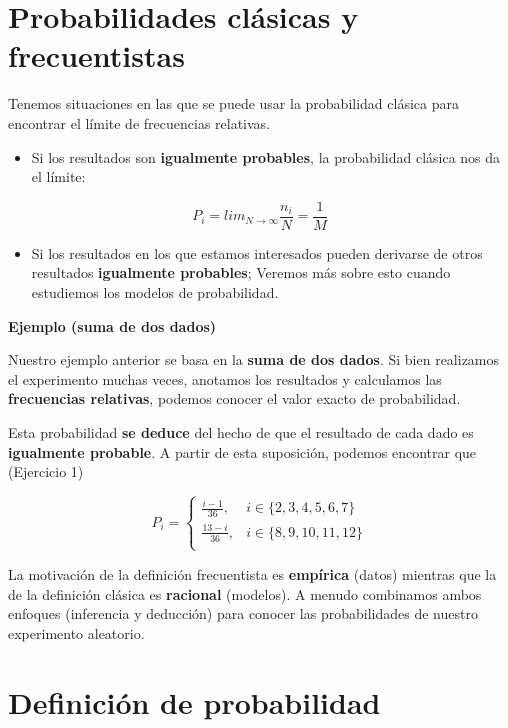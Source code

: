 \documentclass[
]{book}
\providecommand{\tightlist}{%
  \setlength{\itemsep}{0pt}\setlength{\parskip}{0pt}}
\begin{document}
\hypertarget{probabilidades-cluxe1sicas-y-frecuentistas}{%
\section{Probabilidades clásicas y frecuentistas}\label{probabilidades-cluxe1sicas-y-frecuentistas}}

Tenemos situaciones en las que se puede usar la probabilidad clásica para encontrar el límite de frecuencias relativas.

\begin{itemize}
\tightlist
\item
  Si los resultados son \textbf{igualmente probables}, la probabilidad clásica nos da el límite:
\end{itemize}

\[P_i=lim_{N\rightarrow \infty} \frac{n_i}{N}=\frac{1}{M}\]

\begin{itemize}
\tightlist
\item
  Si los resultados en los que estamos interesados pueden derivarse de otros resultados \textbf{igualmente probables}; Veremos más sobre esto cuando estudiemos los modelos de probabilidad.
\end{itemize}

\textbf{Ejemplo (suma de dos dados)}

Nuestro ejemplo anterior se basa en la \textbf{suma de dos dados}.
Si bien realizamos el experimento muchas veces, anotamos los resultados y calculamos las \textbf{frecuencias relativas}, podemos conocer el valor exacto de probabilidad.

Esta probabilidad \textbf{se deduce} del hecho de que el resultado de cada dado es \textbf{igualmente probable}. A partir de esta suposición, podemos encontrar que (Ejercicio 1)

\[
    P_i= 
\begin{cases}
   \frac{i-1}{36},& i \in \{2,3,4,5,6, 7\} \\
\frac{13-i}{36},& i \in \{8,9,10,11,12\} \\ 
\end{cases}
\]

La motivación de la definición frecuentista es \textbf{empírica} (datos) mientras que la de la definición clásica es \textbf{racional} (modelos). A menudo combinamos ambos enfoques (inferencia y deducción) para conocer las probabilidades de nuestro experimento aleatorio.

\hypertarget{definiciuxf3n-de-probabilidad}{%
\section{Definición de probabilidad}\label{definiciuxf3n-de-probabilidad}}
\end{document}
